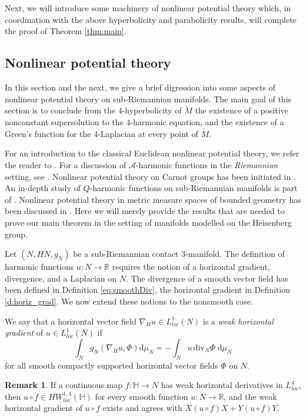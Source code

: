 \documentclass[10pt,letterpaper]{amsart}
\theoremstyle{definition}
\newtheorem{remark}[thm]{Remark}
\numberwithin{thm}{subsection}
\numberwithin{equation}{section}
\begin{document}
Next, we will introduce some machinery of nonlinear potential theory which, in coordination with the above hyperbolicity and parabolicity results, will complete the proof of Theorem \ref{thm:main}.

\subsection{Nonlinear potential theory}
\label{sec:potentialtheory}

In this section and the next, we give a brief digression into some aspects of nonlinear potential theory on sub-Riemannian manifolds.
The main goal of this section is to conclude from the
$4$-hyperbolicity of $\widetilde M$ the existence of a positive
nonconstant supersolution to the $4$-harmonic equation, and the existence
of a Green's function for the $4$-Laplacian at every point of
$\widetilde M$.

For an introduction to the classical Euclidean nonlinear potential theory, we refer the reader to \cite{MR1207810}. For a
discussion of $\mathcal{A}$-harmonic functions in the \emph{Riemannian} setting, see \cite{MR2039956}.
Nonlinear potential theory on Carnot groups has been initiated in \cite{MR1630785}. An in-depth
study of $Q$-harmonic functions on sub-Riemannian manifolds is part of \cite{CLDO}. Nonlinear potential theory in metric measure spaces of bounded geometry has been discussed in
\cite{MR2867756}. Here we will merely provide the results that are needed to prove our main theorem in the setting of manifolds modelled on the Heisenberg group.

Let $(N,HN,g_N)$ be a sub-Riemannian contact $3$-manifold. The definition of harmonic functions $u:N \to \mathbb{R}$ requires the notion of a horizontal gradient, divergence, and a Laplacian on $N$.
 The divergence of a smooth vector field has been defined in Definition \ref{eq:smoothDiv}, the horizontal gradient in Definition \ref{d:horiz_grad}. We now extend these notions to the nonsmooth case.

We say that a horizontal vector field $\nabla_H u \in
L^1_{loc}(N)$ is a \emph{weak horizontal gradient} of $u\in
L_{loc}^1(N)$ if
\begin{displaymath}
\int_N g_N(\nabla_H u, \Phi)\mathrm{d}\mu_N = - \int_N u\,
\mathrm{div}_N\Phi \;\mathrm{d}\mu_N
\end{displaymath}
for all smooth compactly supported horizontal vector fields $\Phi$ on $N$.

\begin{remark}
If a continuous map $f:{\mathbb H} \to N$ has weak horizontal
derivatives in $L^4_{loc}$, then $u\circ f\in
HW_{loc}^{1,4}({\mathbb H})$ for every smooth function $u:N\to
\mathbb{R}$, and the weak horizontal gradient of $u\circ f$
exists and agrees with $X(u\circ f)X + Y(u\circ f)Y$.
\end{remark}
\end{document}
